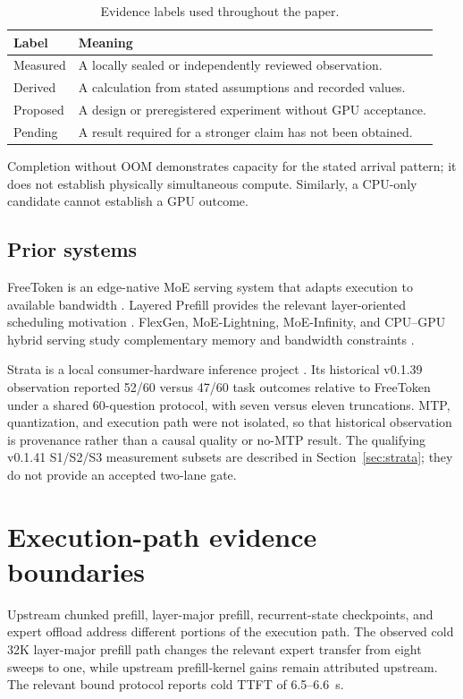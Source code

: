 \documentclass[11pt]{article}
\begin{document}
\begin{table}[t]
\centering
\small
\begin{tabular}{ll}
\toprule
Label & Meaning \\
\midrule
Measured & A locally sealed or independently reviewed observation. \\
Derived & A calculation from stated assumptions and recorded values. \\
Proposed & A design or preregistered experiment without GPU acceptance. \\
Pending & A result required for a stronger claim has not been obtained. \\
\bottomrule
\end{tabular}
\caption{Evidence labels used throughout the paper.}
\label{tab:labels}
\end{table}

Completion without OOM demonstrates capacity for the stated arrival pattern; it does not establish physically simultaneous compute. Similarly, a CPU-only candidate cannot establish a GPU outcome.

\subsection{Prior systems}

FreeToken is an edge-native MoE serving system that adapts execution to available bandwidth \cite{freetoken}. Layered Prefill provides the relevant layer-oriented scheduling motivation \cite{layeredprefill}. FlexGen, MoE-Lightning, MoE-Infinity, and CPU--GPU hybrid serving study complementary memory and bandwidth constraints \cite{flexgen,moelightning,moeinfinity,hybrid}.

Strata is a local consumer-hardware inference project \cite{strata}. Its historical v0.1.39 observation reported 52/60 versus 47/60 task outcomes relative to FreeToken under a shared 60-question protocol, with seven versus eleven truncations. MTP, quantization, and execution path were not isolated, so that historical observation is provenance rather than a causal quality or no-MTP result. The qualifying v0.1.41 S1/S2/S3 measurement subsets are described in Section~\ref{sec:strata}; they do not provide an accepted two-lane gate.

\section{Execution-path evidence boundaries}

Upstream chunked prefill, layer-major prefill, recurrent-state checkpoints, and expert offload address different portions of the execution path. The observed cold 32K layer-major prefill path changes the relevant expert transfer from eight sweeps to one, while upstream prefill-kernel gains remain attributed upstream. The relevant bound protocol reports cold TTFT of 6.5--6.6~s.
\end{document}
